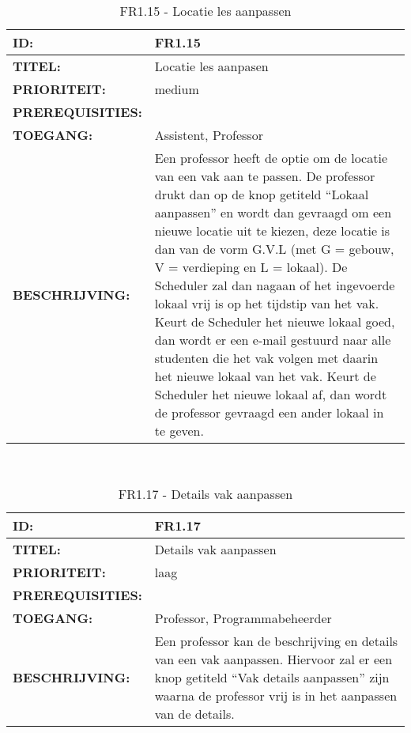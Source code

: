 \noindent\begin{table}[H]
            \begin{tabular}{l | p{10cm}}
                \textbf{ID:} & FR1.15 \\ \hline
                \textbf{TITEL:} & Locatie les aanpasen\\ \hline
                \textbf{PRIORITEIT:} &  medium \\ \hline
                \textbf{PREREQUISITIES:} & \\ \hline
                \textbf{TOEGANG:} & Assistent, Professor \\ \hline
                \textbf{BESCHRIJVING:} & Een professor heeft de optie om de locatie van een vak aan te passen. 
                                        De professor drukt dan op de knop getiteld “Lokaal aanpassen” en wordt dan gevraagd om een nieuwe locatie uit te kiezen, deze locatie is dan van de vorm G.V.L (met G = gebouw, V = verdieping en L = lokaal). De Scheduler zal dan nagaan of het ingevoerde lokaal vrij is op het tijdstip van het vak. Keurt de Scheduler het nieuwe lokaal goed, dan wordt er een e-mail gestuurd naar alle studenten die het vak volgen met daarin het nieuwe lokaal van het vak. Keurt de Scheduler het nieuwe lokaal af, dan wordt de professor gevraagd een ander lokaal in te geven.\\ 
            \end{tabular}\\
            \caption{FR1.15 - Locatie les aanpassen}
            \label{tab:FR1.15 - Locatie les aanpassen}
        \end{table}
\noindent\begin{table}[H]
            \begin{tabular}{l | p{10cm}}
                \textbf{ID:} & FR1.17 \\ \hline
                \textbf{TITEL:} & Details vak aanpassen\\ \hline
                \textbf{PRIORITEIT:} &  laag \\ \hline
                \textbf{PREREQUISITIES:} & \\ \hline
                \textbf{TOEGANG:} & Professor, Programmabeheerder \\ \hline
                \textbf{BESCHRIJVING:} & Een professor kan de beschrijving en details van een vak aanpassen. Hiervoor zal er een knop getiteld “Vak details aanpassen” zijn waarna de professor vrij is in het aanpassen van de details. \\ 
            \end{tabular}\\
            \caption{FR1.17 - Details vak aanpassen}
            \label{tab:FR1.17 - Details vak aanpassen}
        \end{table}
 

